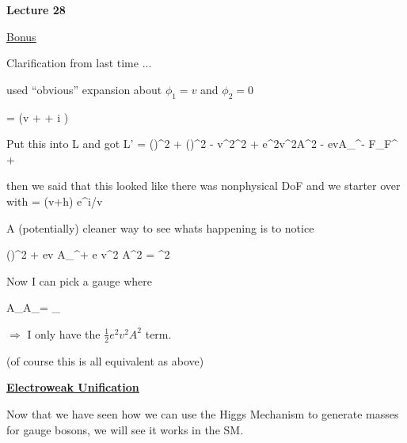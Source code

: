 
\usepackage{braket}
\usepackage{bbm}
\usepackage{relsize}
\usepackage{tcolorbox}




\usepackage{fancyhdr}
\usepackage{ dsfont }


\fancyhf{}


\thispagestyle{fancy}

\begin{center}
{\huge \textbf{Lecture 28}}
\end{center}

{\fontsize{14}{16}\selectfont

\underline{\underline{Bonus}}  

Clarification from last time ... 

used ``obvious'' expansion about $\phi_1 = v$ and $\phi_2 = 0$

\be
\phi = (v + \eta + i \epsilon)
\ee

Put this into L and got 
\be
L' = (\partial \epsilon)^2 + (\partial \eta)^2 - v^2\lambda\eta^2 + e^2v^2A^2 - evA_\mu\partial^\mu\epsilon - F_{\mu\nu}F^{\mu\nu} + 
\ee

then we said that this looked like there was nonphysical DoF and we starter over with 
\be
\phi = (v+h) e^{i\theta/v}
\ee

A (potentially) cleaner way to see whats happening is to notice 

\be
{} (\partial \epsilon)^2 + ev A_\mu \partial^\mu \epsilon + e v^2 A^2 = ^2
\ee

Now I can pick a gauge where 

\be
A_\mu \rightarrow A_\mu =  \partial_\mu \epsilon
\ee

$\Rightarrow$ I only have the $\frac{1}{2}e^2v^2A^2$ term.

(of course this is all equivalent as above)

\clearpage

\textbf{\underline{\underline{Electroweak Unification}}}

Now that we have seen how we can use the Higgs Mechanism to generate masses for gauge bosons, we will see it works in the SM.

}
